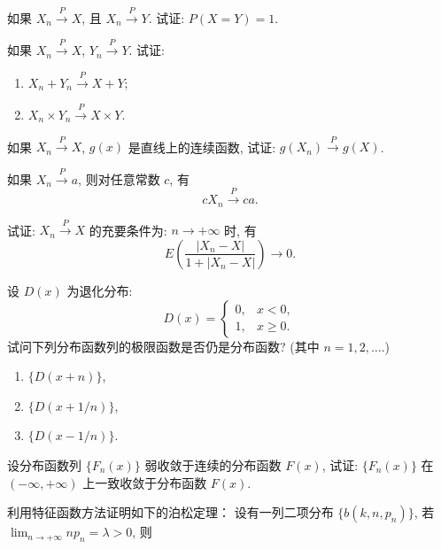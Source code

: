 \begin{xiti}
    \item 如果 $ X_n \stackrel{P}{\to} X $, 且 $ X_n \stackrel{P}{\to} Y $. 试证: $ P ( X = Y ) = 1 $.
    \item 如果 $ X_n \stackrel{P}{\to} X $, $ Y_n \stackrel{P}{\to} Y $. 试证:
    \begin{enumerate}
        \item $ X_n + Y_n \stackrel{P}{\to} X + Y $;
        \item $ X_n \times Y_n \stackrel{P}{\to} X \times Y $.
    \end{enumerate}
    \item 如果 $ X_n \stackrel{P}{\to} X $, $ g (x) $ 是直线上的连续函数, 试证: $ g ( X_n ) \stackrel{P}{\to} g (X) $.
    \item 如果 $ X_n \stackrel{P}{\to} a $, 则对任意常数 $ c $, 有
    \begin{equation*}
        c X_n \stackrel{P}{\to} ca.
    \end{equation*}
    \item 试证: $ X_n \stackrel{P}{\to} X $ 的充要条件为: $ n \to +\infty $ 时, 有
    \begin{equation*}
        E \left( \frac{\lvert X_n - X \rvert}{1 + \lvert X_n - X \rvert} \right) \to 0.
    \end{equation*}
    \item 设 $ D (x) $ 为退化分布:
    \begin{equation*}
        D (x) =
        \begin{cases}
            0, & x < 0,\\
            1, & x \geq 0.
        \end{cases}
    \end{equation*}
    试问下列分布函数列的极限函数是否仍是分布函数? (其中 $ n = 1, 2, \dotsc $.)
    \begin{enumerate}
        \item $ \{ D ( x + n ) \} $,
        \item $ \{ D ( x + 1/n ) \} $,
        \item $ \{ D ( x - 1/n ) \} $.
    \end{enumerate}
    \item 设分布函数列 $ \{ F_n (x) \} $ 弱收敛于连续的分布函数 $ F (x) $, 试证: $ \{ F_n (x) \} $ 在 $ ( -\infty, +\infty ) $ 上一致收敛于分布函数 $ F (x) $.
    \item 利用特征函数方法证明如下的泊松定理： 设有一列二项分布 $ \{ b ( k, n, p_n ) \} $, 若 $ \lim_{n \to +\infty} n p_n = \lambda > 0 $, 则

\end{xiti}
